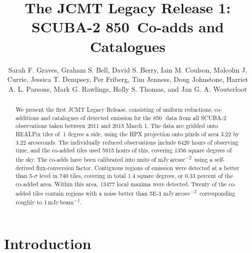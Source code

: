 \documentclass[twocolumn,times]{aastex6}
\newcommand{\um}{\micron}
\newcommand{\jyas}{Jy\,arcsec\textsuperscript{$-$2}}
\newcommand{\jybm}{Jy\,beam\textsuperscript{$-$1}}
\begin{document}
\title{The JCMT Legacy Release 1: SCUBA-2 850\micron\ Co-adds and Catalogues}

\author{Sarah F. Graves,
     Graham S. Bell,
     David S. Berry,
     Iain M. Coulson,
     Malcolm J. Currie,
     Jessica T. Dempsey,
     Per Friberg,
     Tim Jenness,
     Doug Johnstone,
     Harriet A. L. Parsons,
     Mark G. Rawlings,
     Holly S. Thomas,
    and Jan G. A. Wouterloot
}

\begin{abstract}
  We present the first JCMT Legacy Release, consisting of uniform
  reductions, co-additions and catalogues of detected emission for the
  850\,\um\ data from all SCUBA-2 observations taken between 2011 and
  2015 March 1. The data are gridded onto HEALPix
  tiles of $~$1 degree a side, using the HPX projection onto pixels of
  area 3.22 by 3.22 arcseconds. The individually reduced observations
  include 6420 hours of observing time, and the co-added tiles used
  5915 hours of this, covering 1356 square degrees of
  the sky. The co-adds have been calibrated into units of m\jyas\ using
  a self-derived flux-conversion factor. Contiguous regions of
  emission were detected at a better than 5-$\sigma$ level in 740
  tiles, covering in total 1.4 square degrees, or 0.33 percent of the
  co-added area. Within this area, 13477 local maxima were
  detected. Twenty of the co-added tiles contain regions with a noise
  better than 5E-3 m\jyas\, corresponding roughly to 1\,m\jybm.
\end{abstract}


\section{Introduction}
\end{document}
